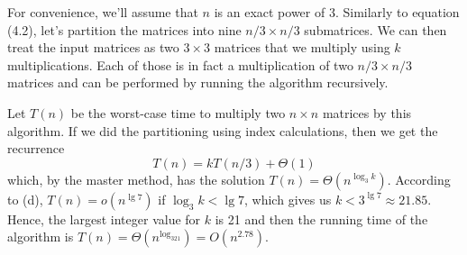 For convenience, we'll assume that $n$ is an exact power of 3.
Similarly to equation (4.2), let's partition the matrices into nine $n/3\times n/3$ submatrices.
We can then treat the input matrices as two $3\times3$ matrices that we multiply using $k$ multiplications.
Each of those is in fact a multiplication of two $n/3\times n/3$ matrices and can be performed by running the algorithm recursively.

Let $T(n)$ be the worst-case time to multiply two $n\times n$ matrices by this algorithm.
If we did the partitioning using index calculations, then we get the recurrence
\[
    T(n) = kT(n/3)+\Theta(1)
\]
which, by the master method, has the solution $T(n)=\Theta(n^{\log_3k})$.
According to (d), $T(n)=o(n^{\lg7})$ if $\log_3k<\lg7$, which gives us $k<3^{\lg7}\approx21.85$.
Hence, the largest integer value for $k$ is 21 and then the running time of the algorithm is $T(n)=\Theta(n^{\log_321})=O(n^{2.78})$.
